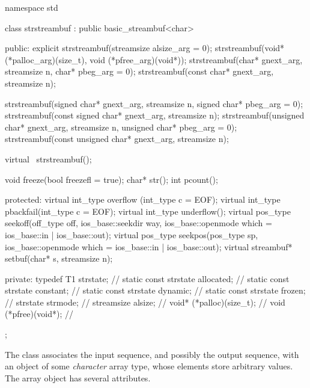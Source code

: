 %
\begin{codeblock}
namespace std {
  class strstreambuf : public basic_streambuf<char> {
  public:
    explicit strstreambuf(streamsize alsize_arg = 0);
    strstreambuf(void* (*palloc_arg)(size_t), void (*pfree_arg)(void*));
    strstreambuf(char* gnext_arg, streamsize n, char* pbeg_arg = 0);
    strstreambuf(const char* gnext_arg, streamsize n);

    strstreambuf(signed char* gnext_arg, streamsize n,
                 signed char* pbeg_arg = 0);
    strstreambuf(const signed char* gnext_arg, streamsize n);
    strstreambuf(unsigned char* gnext_arg, streamsize n,
                 unsigned char* pbeg_arg = 0);
    strstreambuf(const unsigned char* gnext_arg, streamsize n);

    virtual ~strstreambuf();

    void  freeze(bool freezefl = true);
    char* str();
    int   pcount();

  protected:
    virtual int_type overflow (int_type c = EOF);
    virtual int_type pbackfail(int_type c = EOF);
    virtual int_type underflow();
    virtual pos_type seekoff(off_type off, ios_base::seekdir way,
                             ios_base::openmode which
                               = ios_base::in | ios_base::out);
    virtual pos_type seekpos(pos_type sp, ios_base::openmode which
                               = ios_base::in | ios_base::out);
    virtual streambuf* setbuf(char* s, streamsize n);

  private:
    typedef T1 strstate;              // \expos
    static const strstate allocated;  //  \expos
    static const strstate constant;   // \expos
    static const strstate dynamic;    // \expos
    static const strstate frozen;     // \expos
    strstate strmode;                 // \expos
    streamsize alsize;                // \expos
    void* (*palloc)(size_t);          // \expos
    void (*pfree)(void*);             // \expos
  };
}
\end{codeblock}

\pnum
The class
associates the input sequence, and possibly the output sequence, with an object of some
\textit{character}
array type, whose elements store arbitrary values.
The array object has several attributes.

